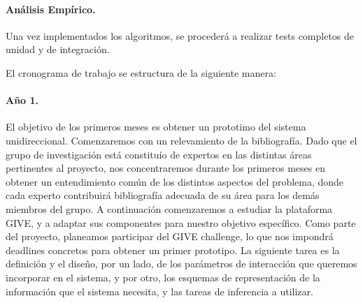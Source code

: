 \paragraph{An\'alisis Emp\'irico.}
Una vez
implementados los algoritmos, se proceder\'a a realizar tests
completos de unidad y de integraci\'on.



El cronograma de trabajo se estructura de la siguiente manera:

\paragraph{A\~no 1.} El objetivo de los primeros meses es obtener un
prototimo del sistema unidireccional.  Comenzaremos con un relevamiento
de la bibliograf\'ia.  Dado que el grupo de investigaci\'on est\'a
constitu\'io de expertos en las distintas \'areas pertinentes al
proyecto, nos concentraremos durante los primeros meses en obtener un
entendimiento com\'un de los distintos aspectos del problema, donde
cada experto contribuir\'a bibliograf\'ia adecuada de su \'area para los
dem\'as miembros del grupo.  A continuaci\'on comenzaremos a estudiar
la plataforma GIVE, y a adaptar sus componentes para nuestro objetivo
espec\'ifico.  Como parte del proyecto, planeamos participar del GIVE
challenge, lo que nos impondr\'a deadlines concretos para obtener un
primer prototipo.  La siguiente tarea es la definici\'on  y el dise\~no,
por un lado, de los par\'ametros de interacci\'on que queremos incorporar
en el sistema, y por otro, los esquemas de representaci\'on de la
informaci\'on que el sistema necesita, y las tareas de inferencia a
utilizar.


